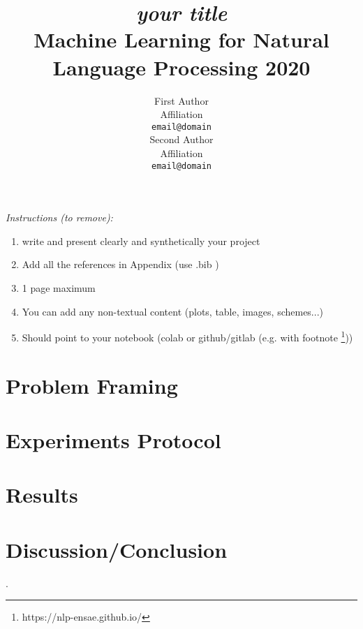 \documentclass[11pt,a4paper]{article}
\title{\textit{your title} \\
Machine Learning for Natural Language Processing 2020}
\author{First Author \\
  Affiliation  \\
  \texttt{email@domain} \\\And
  Second Author \\
  Affiliation \\
  \texttt{email@domain} \\}
\date{}
\begin{document}
\maketitle


\textit{Instructions (to remove):}
\begin{enumerate}
    \item write and present clearly and synthetically your project 
    \item Add all the references in Appendix (use .bib \cite{10test})
    \item 1 page maximum 
    \item  You can add any non-textual content (plots, table, images, schemes...) 
    \item Should point to your notebook (colab or github/gitlab (e.g. with footnote \footnote{https://nlp-ensae.github.io/}))
\end{enumerate}


\bigskip

\begin{abstract}
\end{abstract}

\section{Problem Framing}

\section{Experiments Protocol}
\section{Results}

\section{Discussion/Conclusion}




\newpage
.
\newpage

%



\appendix
\end{document}
